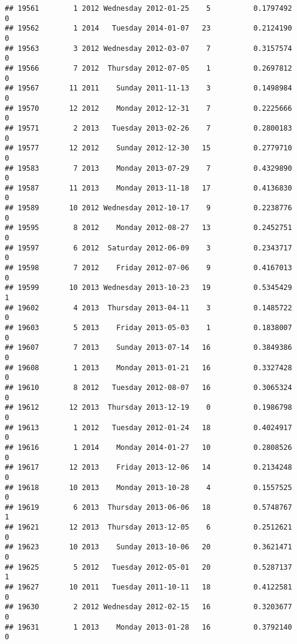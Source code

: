 \documentclass[
]{article}
\begin{document}
\begin{verbatim}
## 19561        1 2012 Wednesday 2012-01-25    5          0.1797492             0
## 19562        1 2014   Tuesday 2014-01-07   23          0.2124190             0
## 19563        3 2012 Wednesday 2012-03-07    7          0.3157574             0
## 19566        7 2012  Thursday 2012-07-05    1          0.2697812             0
## 19567       11 2011    Sunday 2011-11-13    3          0.1498984             0
## 19570       12 2012    Monday 2012-12-31    7          0.2225666             0
## 19571        2 2013   Tuesday 2013-02-26    7          0.2800183             0
## 19577       12 2012    Sunday 2012-12-30   15          0.2779710             0
## 19583        7 2013    Monday 2013-07-29    7          0.4329890             0
## 19587       11 2013    Monday 2013-11-18   17          0.4136830             0
## 19589       10 2012 Wednesday 2012-10-17    9          0.2238776             0
## 19595        8 2012    Monday 2012-08-27   13          0.2452751             0
## 19597        6 2012  Saturday 2012-06-09    3          0.2343717             0
## 19598        7 2012    Friday 2012-07-06    9          0.4167013             0
## 19599       10 2013 Wednesday 2013-10-23   19          0.5345429             1
## 19602        4 2013  Thursday 2013-04-11    3          0.1485722             0
## 19603        5 2013    Friday 2013-05-03    1          0.1838007             0
## 19607        7 2013    Sunday 2013-07-14   16          0.3849386             0
## 19608        1 2013    Monday 2013-01-21   16          0.3327428             0
## 19610        8 2012   Tuesday 2012-08-07   16          0.3065324             0
## 19612       12 2013  Thursday 2013-12-19    0          0.1986798             0
## 19613        1 2012   Tuesday 2012-01-24   18          0.4024917             0
## 19616        1 2014    Monday 2014-01-27   10          0.2808526             0
## 19617       12 2013    Friday 2013-12-06   14          0.2134248             0
## 19618       10 2013    Monday 2013-10-28    4          0.1557525             0
## 19619        6 2013  Thursday 2013-06-06   18          0.5748767             1
## 19621       12 2013  Thursday 2013-12-05    6          0.2512621             0
## 19623       10 2013    Sunday 2013-10-06   20          0.3621471             0
## 19625        5 2012   Tuesday 2012-05-01   20          0.5287137             1
## 19627       10 2011   Tuesday 2011-10-11   18          0.4122581             0
## 19630        2 2012 Wednesday 2012-02-15   16          0.3203677             0
## 19631        1 2013    Monday 2013-01-28   16          0.3792140             0

\end{verbatim}
\end{document}
